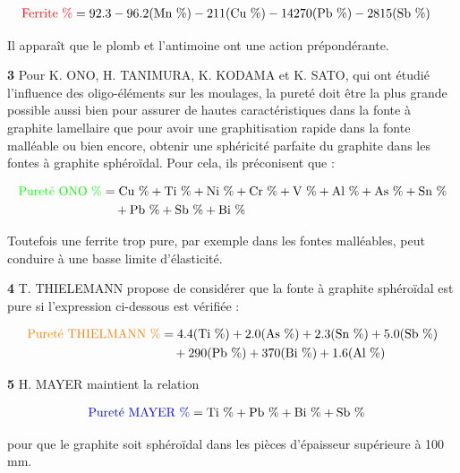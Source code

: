 \documentclass[12pt]{article}
\begin{document}
\begin{align*}
    \textcolor{red}{\text{Ferrite \%}} &= 92.3 - 96.2 (\text{Mn \%}) - 211 (\text{Cu \%}) - 14270 (\text{Pb \%}) - 2815 (\text{Sb \%})
\end{align*}


Il apparaît que le plomb et l’antimoine ont une action prépondérante.



\textbf{3} Pour K. ONO, H. TANIMURA, K. KODAMA et K. SATO, qui ont 
étudié l’influence des oligo-éléments sur les moulages, la pureté doit 
être la plus grande possible aussi bien pour assurer de hautes 
caractéristiques dans la fonte à graphite lamellaire que pour avoir 
une graphitisation rapide dans la fonte malléable ou bien encore, 
obtenir une sphéricité parfaite du graphite dans les fontes à graphite 
sphéroïdal. Pour cela, ils préconisent que :

\begin{align*}
    \textcolor{green}{\text{Pureté ONO \%}} &= \text{Cu \%} + \text{Ti \%} + \text{Ni \%} + \text{Cr \%} + \text{V \%} + \text{Al \%} + \text{As \%} + \text{Sn \%} \\
    &\quad + \text{Pb \%} + \text{Sb \%} + \text{Bi \%}
\end{align*}

Toutefois une ferrite trop pure, par exemple dans les fontes malléables, 
peut conduire à une basse limite d'élasticité.



\textbf{4} T. THIELEMANN propose de considérer que la fonte à graphite 
sphéroïdal est pure si l'expression ci-dessous est vérifiée :

\begin{align*}
    \textcolor{orange}{\text{Pureté THIELMANN \%}} &= 4.4 (\text{Ti \%}) + 2.0 (\text{As \%}) + 2.3 (\text{Sn \%}) + 5.0 (\text{Sb \%}) \\
    &\quad + 290 (\text{Pb \%}) + 370 (\text{Bi \%}) + 1.6 (\text{Al \%})
\end{align*}


\textbf{5} H. MAYER maintient la relation

\begin{align*}
    \textcolor{blue}{\text{Pureté MAYER \%}} &= \text{Ti \%} + \text{Pb \%} + \text{Bi \%} + \text{Sb \%}
\end{align*}

pour que le graphite soit sphéroïdal dans les pièces d’épaisseur supérieure
à 100 mm.
\end{document}
